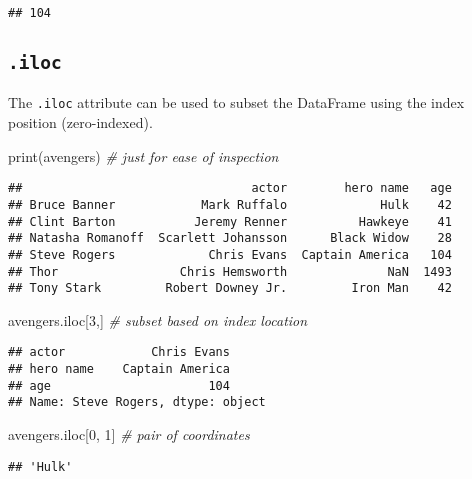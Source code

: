 \documentclass[
]{book}
\newenvironment{Shaded}{\begin{snugshade}}{\end{snugshade}}
\newcommand{\BuiltInTok}[1]{#1}
\newcommand{\CommentTok}[1]{\textcolor[rgb]{0.56,0.35,0.01}{\textit{#1}}}
\newcommand{\DecValTok}[1]{\textcolor[rgb]{0.00,0.00,0.81}{#1}}
\newcommand{\NormalTok}[1]{#1}
\begin{document}
\begin{verbatim}
## 104
\end{verbatim}

\hypertarget{iloc}{%
\subsection{\texorpdfstring{\texttt{.iloc}}{.iloc}}\label{iloc}}

The \texttt{.iloc} attribute can be used to subset the DataFrame using the index position (zero-indexed).

\begin{Shaded}
\begin{Highlighting}[]
\BuiltInTok{print}\NormalTok{(avengers) }\CommentTok{\# just for ease of inspection}
\end{Highlighting}
\end{Shaded}

\begin{verbatim}
##                                actor        hero name   age
## Bruce Banner            Mark Ruffalo             Hulk    42
## Clint Barton           Jeremy Renner          Hawkeye    41
## Natasha Romanoff  Scarlett Johansson      Black Widow    28
## Steve Rogers             Chris Evans  Captain America   104
## Thor                 Chris Hemsworth              NaN  1493
## Tony Stark         Robert Downey Jr.         Iron Man    42
\end{verbatim}

\begin{Shaded}
\begin{Highlighting}[]
\NormalTok{avengers.iloc[}\DecValTok{3}\NormalTok{,] }\CommentTok{\# subset based on index location}
\end{Highlighting}
\end{Shaded}

\begin{verbatim}
## actor            Chris Evans
## hero name    Captain America
## age                      104
## Name: Steve Rogers, dtype: object
\end{verbatim}

\begin{Shaded}
\begin{Highlighting}[]
\NormalTok{avengers.iloc[}\DecValTok{0}\NormalTok{, }\DecValTok{1}\NormalTok{] }\CommentTok{\# pair of coordinates}
\end{Highlighting}
\end{Shaded}

\begin{verbatim}
## 'Hulk'
\end{verbatim}
\end{document}
